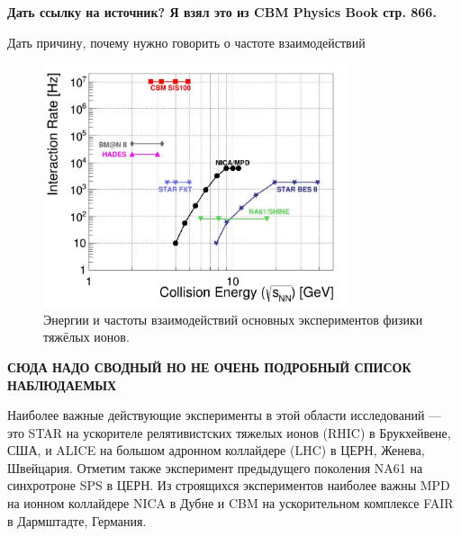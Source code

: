 \todo \textbf{Дать ссылку на источник? Я взял это из CBM Physics Book стр. 866.}


\todo Дать причину, почему нужно говорить о частоте взаимодействий

\begin{figure}[H]
\includegraphics[width=0.8\textwidth]{pictures/Experiments.png}
\caption{Энергии и частоты взаимодействий основных экспериментов физики тяжёлых ионов.}
\label{fig:Experiments}
\end{figure}


\textbf{СЮДА НАДО СВОДНЫЙ НО НЕ ОЧЕНЬ ПОДРОБНЫЙ СПИСОК НАБЛЮДАЕМЫХ}

Наиболее важные действующие эксперименты в этой области исследований --- это STAR на ускорителе релятивистских тяжелых ионов (RHIC) в Брукхейвене, США, и ALICE на большом адронном коллайдере (LHC) в ЦЕРН, Женева, Швейцария. Отметим также эксперимент предыдущего поколения NA61 на синхротроне SPS в ЦЕРН. Из строящихся экспериментов наиболее важны MPD на ионном коллайдере NICA в Дубне и CBM на ускорительном комплексе FAIR в Дармштадте, Германия.




